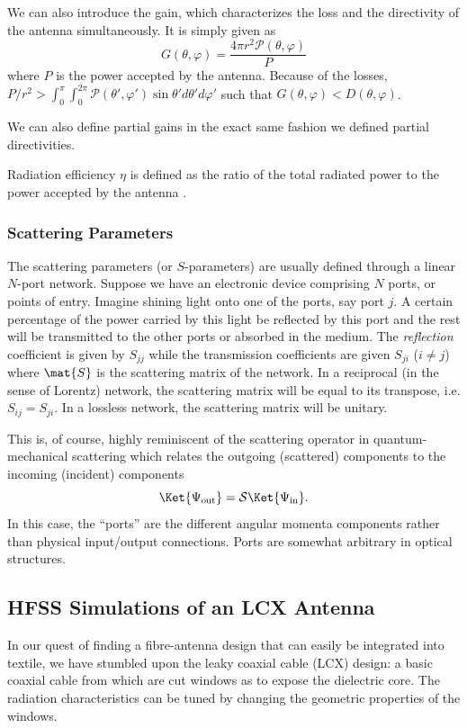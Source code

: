 We can also introduce the gain, which characterizes the loss
and the directivity of the antenna simultaneously. It is simply given
as
  \begin{equation}
    G(\theta,\varphi) = \frac{4\pi r^2\mathcal{P}(\theta,\varphi)}{P}
  \end{equation}
where $P$ is the power accepted by the antenna. Because of the 
losses, $P/r^2>\int_0^\pi\int_0^{2\pi}\mathcal{P}(\theta',\varphi')\sin\theta'd\theta'd\varphi'$
such that $G(\theta,\varphi)<D(\theta,\varphi)$. 

We can also define partial gains in the exact same fashion we defined partial
directivities.

Radiation efficiency $\eta$ is defined as the ratio of the total radiated power 
to the power accepted by the antenna \cite{IEEE145-1993}.

\subsubsection{Scattering Parameters}
The scattering parameters (or $S$-parameters) are
usually defined through a linear $N$-port network. 
Suppose we have an electronic device comprising
$N$ ports, or points of entry. Imagine shining light onto
one of the ports, say port $j$. A certain percentage
of the power carried by this light be reflected 
by this port and the rest will be transmitted to the
other ports or absorbed in the medium. The \textit{reflection}
coefficient is given by $S_{jj}$ while the transmission
coefficients are given $S_{ji}$ ($i\neq j$) where $\mat{S}$
is the scattering matrix of the network. In a reciprocal (in the sense
of Lorentz) network, the scattering matrix will be equal to its
transpose, i.e. $S_{ij}=S_{ji}$. In a lossless network, the scattering
matrix will be unitary. 

This is, of course, highly reminiscent of the scattering operator
in quantum-mechanical scattering which relates the outgoing (scattered)
components to the incoming (incident) components
  \begin{equation}
   \Ket{\Psi_\text{out}}=\mathcal{S}\Ket{\Psi_\text{in}}.
  \end{equation}
In this case, the ``ports'' are the different angular momenta
components rather than physical input/output connections. 
Ports are somewhat arbitrary in optical structures.

\subsection{HFSS Simulations of an LCX Antenna}
In our quest of finding a fibre-antenna design that can easily be integrated into
textile, we have stumbled upon the leaky coaxial cable (LCX) design: a basic coaxial cable
from which are cut windows as to expose the dielectric core. The radiation characteristics
can be tuned by changing the geometric properties of the windows. 

